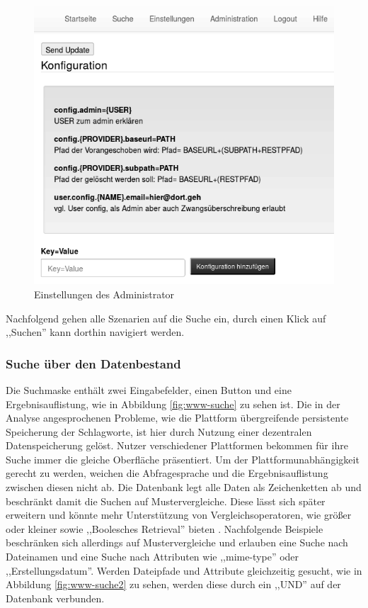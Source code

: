 \documentclass[oneside, ngerman, toc=bibliography,bibliography=totoc,listof=entryprefix, open=right,numbers=noenddot,fontsize=12pt]{scrbook}
\begin{document}
\begin{figure}[htbp] 
    \centering
    \includegraphics[width=\textwidth]{Masterarbeit_Bilder/www_einstellungen_admin.png}
    \caption{Einstellungen des Administrator}
    \label{fig:www-einstellungen-admin}
\end{figure}  



Nachfolgend gehen alle Szenarien auf die Suche ein, durch einen Klick auf ,,Suchen'' kann dorthin navigiert werden. 



\subsubsection{Suche über den Datenbestand}
Die Suchmaske enthält  zwei Eingabefelder, einen Button und eine Ergebnisauflistung, wie in Abbildung \ref{fig:www-suche} zu sehen ist.
Die in der Analyse angesprochenen Probleme, wie die Plattform übergreifende persistente Speicherung der Schlagworte, ist hier durch Nutzung einer dezentralen Datenspeicherung gelöst. Nutzer verschiedener Plattformen bekommen  für ihre Suche immer die gleiche Oberfläche präsentiert. Um der Plattformunabhängigkeit gerecht zu werden, weichen die Abfragesprache und die Ergebnisauflistung zwischen diesen nicht ab. Die Datenbank legt alle Daten als Zeichenketten ab und beschränkt damit die Suchen auf Mustervergleiche. Diese lässt sich später erweitern und könnte mehr Unterstützung von Vergleichsoperatoren, wie größer oder kleiner sowie ,,Boolesches Retrieval'' bieten \cite{kuhlen2013grundlagen}. Nachfolgende Beispiele beschränken sich allerdings auf Mustervergleiche und erlauben eine Suche nach Dateinamen und eine Suche nach Attributen wie ,,mime-type'' oder ,,Erstellungsdatum''.
Werden Dateipfade und Attribute gleichzeitig gesucht, wie in Abbildung \ref{fig:www-suche2} zu sehen, werden diese durch ein ,,UND'' auf der Datenbank verbunden.
\end{document}
